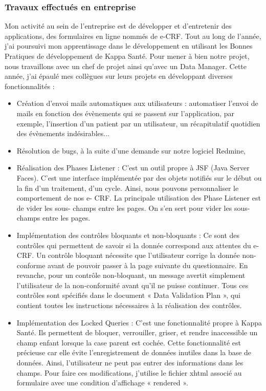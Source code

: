 \subsubsection{Travaux effectués en entreprise}
Mon activité au sein de l’entreprise est de développer et d’entretenir des
applications, des
formulaires en ligne nommés de e-CRF.
Tout au long de l’année, j’ai poursuivi mon apprentissage dans le
développement en utilisant les Bonnes Pratiques de développement de Kappa
Santé.
Pour mener à bien notre projet, nous travaillons avec un chef de projet ainsi
qu’avec un Data Manager.
Cette année, j’ai épaulé mes collègues sur leurs projets en développant
diverses fonctionnalités :
\begin{itemize}
    \item Création d’envoi mails automatiques aux utilisateurs : automatiser l’envoi
    de mails en fonction des évènements qui se passent sur l’application, par
    exemple, l’insertion d’un
    patient par un utilisateur, un récapitulatif quotidien des évènements
    indésirables...
    \item Résolution de bugs, à la suite d’une demande sur notre logiciel Redmine,
    \item Réalisation des Phases Listener : C’est un outil propre à JSF (Java Server
    Faces). C’est une interface implémentée par des objets notifiés sur le début
    ou la fin d’un traitement,
    d’un cycle. Ainsi, nous pouvons personnaliser le comportement de nos e-
    CRF. La principale utilisation des Phase Listener est de vider les sous-
    champs entre les pages. On s’en sert pour vider les sous-champs entre les
    pages.
    \item Implémentation des contrôles bloquants et non-bloquants : Ce sont des
    contrôles qui permettent de savoir si la donnée correspond aux attentes du
    e-CRF. Un contrôle bloquant nécessite que l’utilisateur corrige la donnée non-conforme avant
    de pouvoir passer à la page suivante du questionnaire. En revanche, pour
    un contrôle non-bloquant, un message avertit simplement l’utilisateur de la
    non-conformité avant qu’il ne puisse continuer. Tous ces contrôles sont spécifiés dans le document « Data Validation Plan », qui contient toutes les
    instructions nécessaires à la réalisation des contrôles.
    \item Implémentation des Locked Queries : C’est une fonctionnalité propre à
    Kappa Santé. Ils permettent de bloquer, verrouiller, griser, et rendre
    inaccessible un champ enfant
    lorsque la case parent est cochée. Cette fonctionnalité est précieuse car
    elle évite l’enregistrement de données inutiles dans la base de données.
    Ainsi, l’utilisateur ne peut
    pas entrer des informations dans les champs. Pour faire ces modifications,
    j’utilise le fichier xhtml associé au formulaire avec une condition d’affichage
    « rendered ».
\end{itemize}


